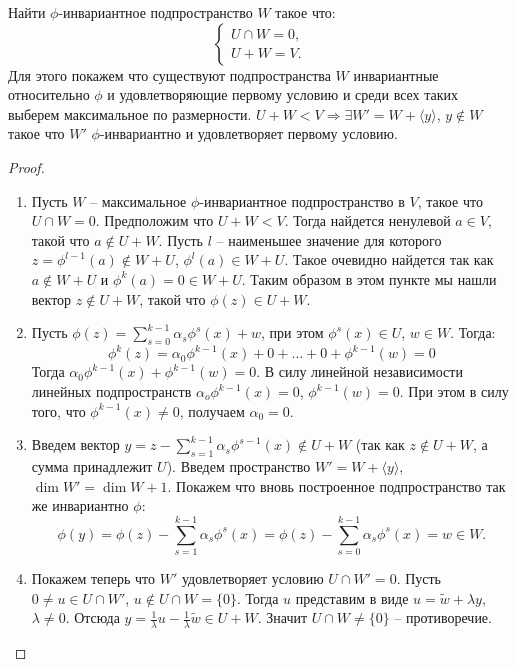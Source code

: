 \begin{idea}
    Найти $\phi$-инвариантное подпространство $W$ такое что:
    \begin{equation}
         \begin{cases}
            U \cap W = {0},\\
            U + W = V.
         \end{cases}
        \end{equation}
    Для этого покажем что существуют подпространства $W$ инвариантные относительно $\phi$ 
    и удовлетворяющие первому условию и среди всех таких выберем максимальное по размерности.
    $U + W < V \Rightarrow \exists W' = W + \langle y\rangle$, $y \notin W$ такое что $W'$ 
    $\phi$-инвариантно и удовлетворяет первому условию.
\end{idea}

\begin{proof}~

    \begin{enumerate}
        \item Пусть $W$ -- максимальное $\phi$-инвариантное подпространство в $V$, 
        такое что $U \cap W = {0}$. Предположим что $U + W < V$. 
        Тогда найдется ненулевой $a \in V$, такой что $ a \notin U + W$.  Пусть $l$ -- наименьшее 
        значение для которого $z = \phi^{l-1}(a) \notin W + U$, $\phi^l(a) \in W + U$. 
        Такое очевидно найдется так как $a \notin W + U$ и $\phi^{k}(a) = 0 \in W + U$.
        Таким образом в этом пункте мы нашли вектор $z \notin U+W$, такой что $\phi(z) \in U + W$.

        \item Пусть $\phi(z) = \displaystyle\sum_{s = 0}^{k-1} \alpha_s \phi^s(x) + w$, 
        при этом $\phi^s(x) \in U$, $w \in W$. Тогда:
        $$\phi^{k}(z) = \alpha_0 \phi^{k-1}(x) + 0 + \dots + 0 + \phi^{k-1}(w) = 0$$ 
        Тогда $\alpha_0 \phi^{k-1}(x) + \phi^{k-1}(w) = 0$. 
        В силу линейной независимости линейных подпространств 
        $\alpha_o \phi^{k-1}(x) = 0$, $\phi^{k-1}(w) = 0$. 
        При этом в силу того, что $\phi^{k-1}(x) \neq 0$, получаем $\alpha_0 = 0$.

        \item Введем вектор $y = z - \displaystyle\sum_{s = 1}^{k-1} \alpha_s \phi^{s-1}(x) \notin U + W$ 
        (так как $z \notin U+W$, а сумма принадлежит $U$).
        Введем пространство $W' = W + \langle y \rangle$, $\dim W' = \dim W + 1$. 
        Покажем что вновь построенное подпространство так же инвариантно $\phi$:
        $$\phi(y) = \phi(z) - \displaystyle\sum_{s=1}^{k-1} \alpha_s \phi^s (x) = \phi(z) - 
        \displaystyle\sum_{s=0}^{k-1} \alpha_s \phi^s (x) = w \in W.$$

        \item Покажем теперь что $W'$ удовлетворяет условию $U \cap W' = {0}$. 
        Пусть $0 \neq u \in U \cap W'$, $u \notin U \cap W = \{ 0 \}$. 
        Тогда $u$ представим в виде $u = \widetilde{w} + \lambda y$, $\lambda \neq 0$. Отсюда 
        $y = \frac{1}{\lambda} u - \frac{1}{\lambda} \widetilde{w} \in U + W$. 
        Значит $U \cap W \neq \{0\}$ -- противоречие.
    \end{enumerate}
\end{proof}

